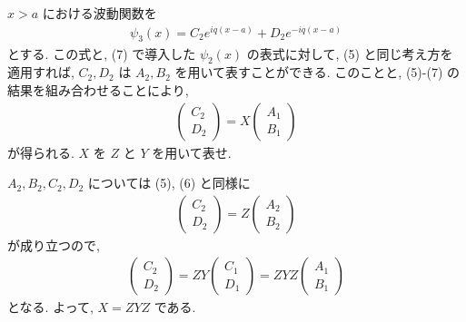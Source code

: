 \documentclass[../../ou-physics-exam.tex]{subfiles}
\begin{document}
$ x > a $ における波動関数を
\begin{align*}
    \psi_3 (x) = C_2 e^{iq(x-a)} + D_2 e^{-iq(x-a)}
\end{align*}
とする. 
この式と, (7) で導入した $ \psi_2 (x) $ の表式に対して, (5) と同じ考え方を適用すれば, $ C_2, D_2 $ は $ A_2, B_2 $ を用いて表すことができる. 
このことと, (5)-(7) の結果を組み合わせることにより,
\begin{align*}
    \begin{pmatrix}
        C_2 \\ D_2
    \end{pmatrix} = X 
    \begin{pmatrix}
        A_1 \\ B_1
    \end{pmatrix}
\end{align*}
が得られる. 
$ X $ を $ Z $ と $ Y $ を用いて表せ.
\begin{answer}
    $ A_2, B_2, C_2, D_2 $ については (5), (6) と同様に
    \begin{align*}
        \begin{pmatrix}
            C_2 \\ D_2
        \end{pmatrix} = Z 
        \begin{pmatrix}
            A_2 \\ B_2
        \end{pmatrix}
    \end{align*}
    が成り立つので,
    \begin{align*}
        \begin{pmatrix}
            C_2 \\ D_2
        \end{pmatrix} = ZY 
        \begin{pmatrix}
            C_1 \\ D_1
        \end{pmatrix} = ZYZ 
        \begin{pmatrix}
            A_1 \\ B_1
        \end{pmatrix}
    \end{align*}
    となる. 
    よって, $ X = ZYZ $ である.
\end{answer}
\end{document}
